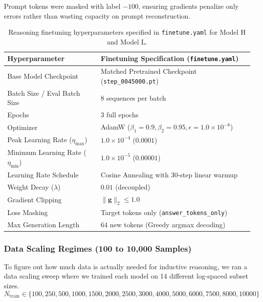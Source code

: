 \documentclass[8pt]{article}
\begin{document}
Prompt tokens were masked with label $-100$, ensuring gradients penalize only errors rather than wasting capacity on prompt reconstruction.
\begin{table}[H]
    \centering
    \small
    \begin{tabular}{ll}
        \toprule
        \textbf{Hyperparameter} & \textbf{Finetuning Specification (\texttt{finetune.yaml})} \\
        \midrule
        Base Model Checkpoint & Matched Pretrained Checkpoint (\texttt{step\_0045000.pt}) \\
        Batch Size / Eval Batch Size & $8$ sequences per batch \\
        Epochs & $3$ full epochs \\
        Optimizer & AdamW ($\beta_1 = 0.9, \beta_2 = 0.95, \epsilon = 1.0 \times 10^{-8}$) \\
        Peak Learning Rate ($\eta_{\text{max}}$) & $1.0 \times 10^{-4}$ ($0.0001$) \\
        Minimum Learning Rate ($\eta_{\text{min}}$) & $1.0 \times 10^{-5}$ ($0.00001$) \\
        Learning Rate Schedule & Cosine Annealing with 30-step linear warmup \\
        Weight Decay ($\lambda$) & $0.01$ (decoupled) \\
        Gradient Clipping & $\|\mathbf{g}\|_2 \le 1.0$ \\
        Loss Masking & Target tokens only (\texttt{answer\_tokens\_only}) \\
        Max Generation Length & $64$ new tokens (Greedy argmax decoding) \\
        \bottomrule
    \end{tabular}
    \caption{Reasoning finetuning hyperparameters specified in \texttt{finetune.yaml} for Model H and Model L.}
    \label{tab:finetune_hyperparams}
\end{table}

\subsubsection{Data Scaling Regimes (100 to 10,000 Samples)}
To figure out how much data is actually needed for inductive reasoning, we ran a data scaling sweep where we trained each model on 14 different log-spaced subset sizes.
\begin{equation}
    N_{\text{train}} \in \{100, 250, 500, 1000, 1500, 2000, 2500, 3000, 4000, 5000, 6000, 7500, 8000, 10000\}
\end{equation}
\end{document}
